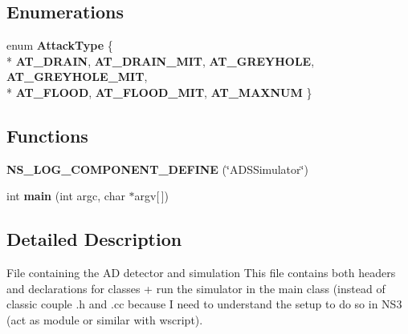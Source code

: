\subsection*{Enumerations}
\begin{DoxyCompactItemize}
\item 
\hypertarget{ads-simulator_8cc_a904b2f9c8f3951116c343784c59d6afe}{}enum {\bfseries Attack\+Type} \{ \\*
{\bfseries A\+T\+\_\+\+D\+R\+A\+I\+N}, 
{\bfseries A\+T\+\_\+\+D\+R\+A\+I\+N\+\_\+\+M\+I\+T}, 
{\bfseries A\+T\+\_\+\+G\+R\+E\+Y\+H\+O\+L\+E}, 
{\bfseries A\+T\+\_\+\+G\+R\+E\+Y\+H\+O\+L\+E\+\_\+\+M\+I\+T}, 
\\*
{\bfseries A\+T\+\_\+\+F\+L\+O\+O\+D}, 
{\bfseries A\+T\+\_\+\+F\+L\+O\+O\+D\+\_\+\+M\+I\+T}, 
{\bfseries A\+T\+\_\+\+M\+A\+X\+N\+U\+M}
 \}\label{ads-simulator_8cc_a904b2f9c8f3951116c343784c59d6afe}

\end{DoxyCompactItemize}
\subsection*{Functions}
\begin{DoxyCompactItemize}
\item 
\hypertarget{ads-simulator_8cc_a796f987c7a114e4a30f99022fac1af0d}{}{\bfseries N\+S\+\_\+\+L\+O\+G\+\_\+\+C\+O\+M\+P\+O\+N\+E\+N\+T\+\_\+\+D\+E\+F\+I\+N\+E} (\char`\"{}A\+D\+S\+Simulator\char`\"{})\label{ads-simulator_8cc_a796f987c7a114e4a30f99022fac1af0d}

\item 
\hypertarget{ads-simulator_8cc_a0ddf1224851353fc92bfbff6f499fa97}{}int {\bfseries main} (int argc, char $\ast$argv\mbox{[}$\,$\mbox{]})\label{ads-simulator_8cc_a0ddf1224851353fc92bfbff6f499fa97}

\end{DoxyCompactItemize}


\subsection{Detailed Description}
File containing the A\+D detector and simulation This file contains both headers and declarations for classes + run the simulator in the main class (instead of classic couple .h and .cc because I need to understand the setup to do so in N\+S3 (act as module or similar with wscript). 

